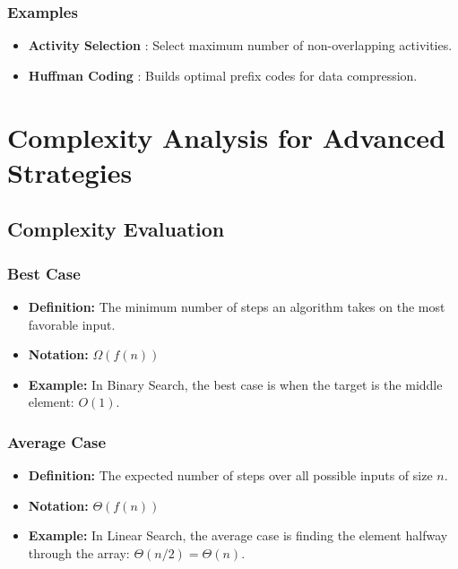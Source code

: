 \documentclass[12pt]{article}
\begin{document}
\subsubsection{Examples} \label{sec:greedy_examples}
\begin{itemize}
    \item \textbf{Activity Selection} \cite{gfg_activity_selection}: Select maximum number of non-overlapping activities.
    \item \textbf{Huffman Coding} \cite{gfg_huffman_video}: Builds optimal prefix codes for data compression.
\end{itemize}

\section{Complexity Analysis for Advanced Strategies}

\subsection{Complexity Evaluation}

\subsubsection{Best Case}
\begin{itemize}
    \item \textbf{Definition:} The minimum number of steps an algorithm takes on the most favorable input.
    \item \textbf{Notation:} \( \Omega(f(n)) \)
    \item \textbf{Example:} In Binary Search, the best case is when the target is the middle element: \( O(1) \).
\end{itemize}

\subsubsection{Average Case}
\begin{itemize}
    \item \textbf{Definition:} The expected number of steps over all possible inputs of size \( n \).
    \item \textbf{Notation:} \( \Theta(f(n)) \)
    \item \textbf{Example:} In Linear Search, the average case is finding the element halfway through the array: \( \Theta(n/2) = \Theta(n) \).
\end{itemize}
\end{document}
